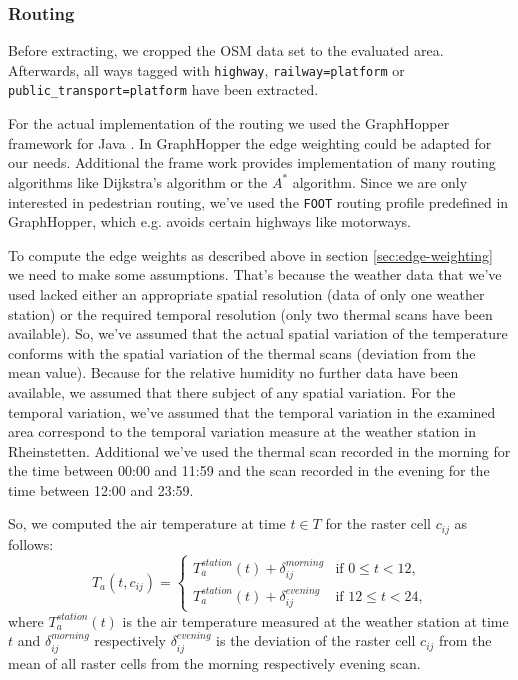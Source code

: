 \subsubsection{Routing}
Before extracting, we cropped the OSM data set to the evaluated area. Afterwards, all ways tagged with \verb|highway|, \verb|railway=platform| or \verb|public_transport=platform| have been extracted.

For the actual implementation of the routing we used the GraphHopper framework for Java \parencite{GraphHopper2016,GraphHopper2016a}. In GraphHopper the edge weighting could be adapted for our needs. Additional the frame work provides implementation of many routing algorithms like Dijkstra's algorithm or the $A^*$ algorithm. Since we are only interested in pedestrian routing, we've used the \verb|FOOT| routing profile predefined in GraphHopper, which e.g. avoids certain highways like motorways.  

To compute the edge weights as described above in section \ref{sec:edge-weighting} we need to make some assumptions. That's because the weather data that we've used lacked either an appropriate spatial resolution (data of only one weather station)  or the required temporal resolution (only two thermal scans have been available). So, we've assumed that the actual spatial variation of the temperature conforms with the spatial variation of the thermal scans (deviation  from the mean value). Because for the relative humidity no further data have been available, we assumed that there subject of any spatial variation. For the temporal variation, we've assumed that the temporal variation in the examined area correspond to the temporal variation measure at the weather station in Rheinstetten.  Additional we've used the thermal scan recorded in the morning for the time between 00:00 and 11:59 and the scan recorded in the evening for the time between 12:00 and 23:59.

So, we computed the air temperature at time $t\in T$ for the raster cell $c_{ij}$ as follows:
\begin{equation}
\label{eq:derived-temperature}
T_a(t, c_{ij}) = \begin{cases}
T_{a}^{station}(t) + \delta_{ij}^{morning} & \text{if $0 \leq t < 12$,}\\
T_{a}^{station}(t) + \delta_{ij}^{evening} & \text{if $12 \leq t < 24$,}
\end{cases}
\end{equation}
where $T_{a}^{station}(t)$ is the air temperature measured at the weather station at time $t$ and $\delta^{morning}_{ij}$ respectively  $\delta^{evening}_{ij}$ is the deviation of the raster cell $c_{ij}$ from the mean of all raster cells from the morning respectively evening scan.

